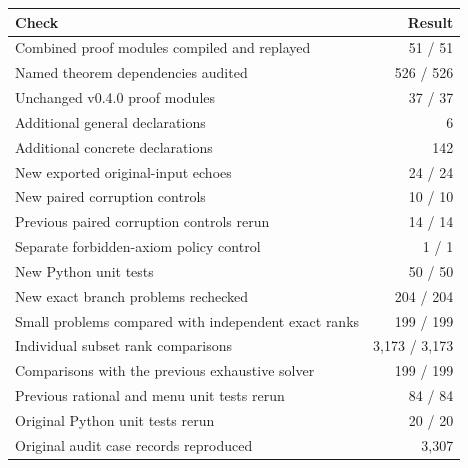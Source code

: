 \documentclass[11pt,letterpaper,oneside,openany]{book}
\theoremstyle{quiet}
\begin{document}
\begin{center}\begin{tabularx}{\linewidth}{@{}Xr@{}}\toprule Check & Result\\\midrule

Combined proof modules compiled and replayed & 51 / 51\\

Named theorem dependencies audited & 526 / 526\\

Unchanged v0.4.0 proof modules & 37 / 37\\

Additional general declarations & 6\\

Additional concrete declarations & 142\\

New exported original-input echoes & 24 / 24\\

New paired corruption controls & 10 / 10\\

Previous paired corruption controls rerun & 14 / 14\\

Separate forbidden-axiom policy control & 1 / 1\\

New Python unit tests & 50 / 50\\

New exact branch problems rechecked & 204 / 204\\

Small problems compared with independent exact ranks & 199 / 199\\

Individual subset rank comparisons & 3,173 / 3,173\\

Comparisons with the previous exhaustive solver & 199 / 199\\

Previous rational and menu unit tests rerun & 84 / 84\\

Original Python unit tests rerun & 20 / 20\\

Original audit case records reproduced & 3,307\\

\bottomrule\end{tabularx}\end{center}
\end{document}
